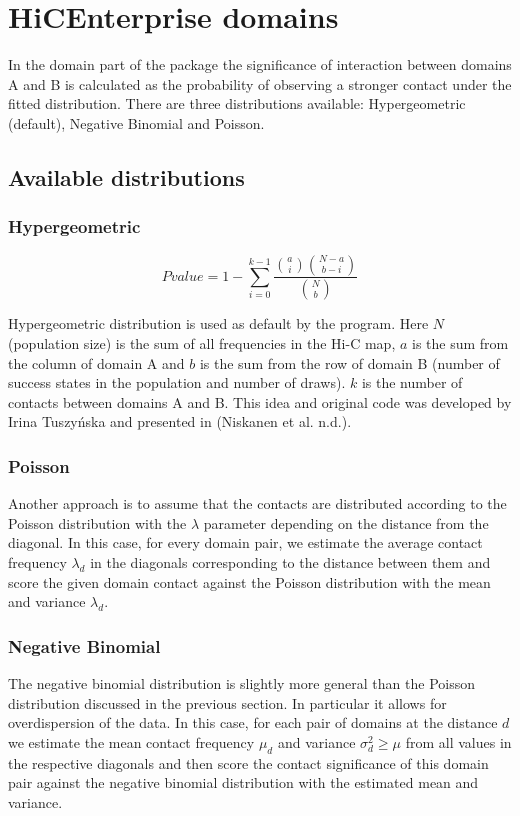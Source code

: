 \chapter{HiCEnterprise domains}
\label{domains}

In the domain part of the package the significance of interaction between domains A and B is calculated as the
probability of observing a stronger contact under the fitted distribution. There are three distributions available:
Hypergeometric (default), Negative Binomial and Poisson.

\section{Available distributions}

\subsection{Hypergeometric}

\begin{equation}
Pvalue = 1 - \sum_{i=0}^{k-1} \frac{{a\choose i}{N-a\choose b-i }}{{N\choose b}}
\end{equation}

Hypergeometric distribution is used as default by the program.
Here $N$ (population size) is the sum of all frequencies in the Hi-C map, $a$ is the sum from the column of domain A and
$b$ is the sum from the row of domain B (number of success states in the population and number of draws). $k$ is the number of contacts between domains A and B. This idea
and original code was developed by Irina Tuszyńska and presented in (Niskanen et al. n.d.).

\subsection{Poisson}
Another approach is to assume that the contacts are distributed according to the Poisson distribution with the $\lambda$ parameter depending on the distance from the diagonal. In this case, for every domain pair, we estimate the average contact frequency $\lambda_d$ in the diagonals corresponding to the distance between them and score the given domain contact against the Poisson distribution with the mean and variance $\lambda_d$.

\subsection{Negative Binomial}
The negative binomial distribution is slightly more general than the Poisson distribution discussed in the previous section. In particular it allows for overdispersion of the data. In this case, for each pair of domains at the distance $d$ we estimate the mean contact frequency $\mu_d$ and variance $\sigma^2_d \geq \mu$ from all values in the respective diagonals and then score the contact significance of this domain pair against the negative binomial distribution with the estimated mean and variance. 

